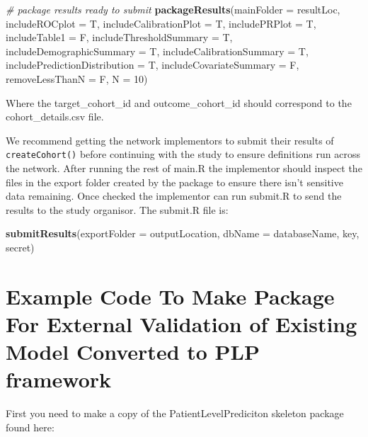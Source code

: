 \documentclass[]{article}
\newenvironment{Shaded}{\begin{snugshade}}{\end{snugshade}}
\newcommand{\KeywordTok}[1]{\textcolor[rgb]{0.13,0.29,0.53}{\textbf{#1}}}
\newcommand{\DataTypeTok}[1]{\textcolor[rgb]{0.13,0.29,0.53}{#1}}
\newcommand{\DecValTok}[1]{\textcolor[rgb]{0.00,0.00,0.81}{#1}}
\newcommand{\CommentTok}[1]{\textcolor[rgb]{0.56,0.35,0.01}{\textit{#1}}}
\newcommand{\NormalTok}[1]{#1}
\begin{document}
\begin{Shaded}
\begin{Highlighting}[]
\CommentTok{# package results ready to submit}
\KeywordTok{packageResults}\NormalTok{(}\DataTypeTok{mainFolder =}\NormalTok{ resultLoc, }\DataTypeTok{includeROCplot =}\NormalTok{ T, }\DataTypeTok{includeCalibrationPlot =}\NormalTok{ T, }
    \DataTypeTok{includePRPlot =}\NormalTok{ T, }\DataTypeTok{includeTable1 =}\NormalTok{ F, }\DataTypeTok{includeThresholdSummary =}\NormalTok{ T, }\DataTypeTok{includeDemographicSummary =}\NormalTok{ T, }
    \DataTypeTok{includeCalibrationSummary =}\NormalTok{ T, }\DataTypeTok{includePredictionDistribution =}\NormalTok{ T, }\DataTypeTok{includeCovariateSummary =}\NormalTok{ F, }
    \DataTypeTok{removeLessThanN =}\NormalTok{ F, }\DataTypeTok{N =} \DecValTok{10}\NormalTok{)}
\end{Highlighting}
\end{Shaded}

Where the target\_cohort\_id and outcome\_cohort\_id should correspond
to the cohort\_details.csv file.

We recommend getting the network implementors to submit their results of
\texttt{createCohort()} before continuing with the study to ensure
definitions run across the network. After running the rest of main.R the
implementor should inspect the files in the export folder created by the
package to ensure there isn't sensitive data remaining. Once checked the
implementor can run submit.R to send the results to the study organisor.
The submit.R file is:

\begin{Shaded}
\begin{Highlighting}[]
\KeywordTok{submitResults}\NormalTok{(}\DataTypeTok{exportFolder =}\NormalTok{ outputLocation, }\DataTypeTok{dbName =}\NormalTok{ databaseName, key, secret)}
\end{Highlighting}
\end{Shaded}

\section{Example Code To Make Package For External Validation of
Existing Model Converted to PLP
framework}\label{example-code-to-make-package-for-external-validation-of-existing-model-converted-to-plp-framework}

First you need to make a copy of the PatientLevelPrediciton skeleton
package found here:
\end{document}
